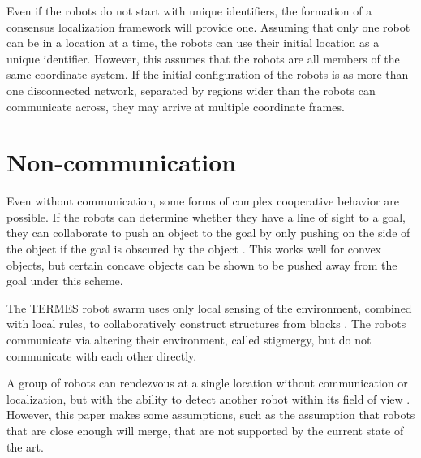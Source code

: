\documentclass[]{article}
\begin{document}
Even if the robots do not start with unique identifiers, the formation of a consensus localization framework will provide one.
Assuming that only one robot can be in a  location at a time, the robots can use their initial location as a unique identifier. 
However, this assumes that the robots are all members of the same coordinate system.
If the initial configuration of the robots is as more than one disconnected network, separated by regions wider than the robots can communicate across, they may arrive at multiple coordinate frames.


\section{Non-communication}

Even without communication, some forms of complex cooperative behavior are possible. 
If the robots can determine whether they have a line of sight to a goal, they can collaborate to push an object to the goal by only pushing on the side of the object if the goal is obscured by the object \cite{chen2015occlusion}. This works well for convex objects, but certain concave objects can be shown to be pushed away from the goal under this scheme. 

The TERMES robot swarm uses only local sensing of the environment, combined with local rules, to collaboratively construct structures from blocks \cite{werfel2014designing}. 
The robots communicate via altering their environment, called stigmergy, but do not communicate with each other directly. 

A group of robots can rendezvous at a single location without communication or localization, but with the ability to detect another robot within its field of view \cite{yu2012rendezvous}. However, this paper makes some assumptions, such as the assumption that robots that are close enough will merge, that are not supported by the current state of the art. 
\end{document}
